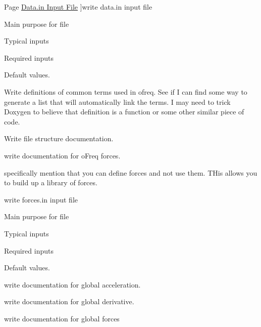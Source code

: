 \begin{DoxyRefList}
Page \hyperlink{in_data}{Data.in Input File} ]write data.\-in input file
\begin{DoxyItemize}
\item Main purpose for file
\item Typical inputs
\item Required inputs
\item Default values. 
\end{DoxyItemize}
\item[\label{todo__todo000039}%
\hypertarget{todo__todo000039}{}%
Page \hyperlink{definitions}{Definitions} ]Write definitions of common terms used in ofreq. See if I can find some way to generate a list that will automatically link the terms. I may need to trick Doxygen to believe that definition is a function or some other similar piece of code. 
\item[\label{todo__todo000037}%
\hypertarget{todo__todo000037}{}%
Page \hyperlink{file_structure}{File Structure} ]Write file structure documentation. 
\item[\label{todo__todo000002}%
\hypertarget{todo__todo000002}{}%
Page \hyperlink{concept_forces}{Forces in o\-Freq} ]write documentation for o\-Freq forces.
\begin{DoxyItemize}
\item specifically mention that you can define forces and not use them. T\-His allows you to build up a library of forces. 
\end{DoxyItemize}
\item[\label{todo__todo000009}%
\hypertarget{todo__todo000009}{}%
Page \hyperlink{in_forces}{Forces.in Input File} ]write forces.\-in input file
\begin{DoxyItemize}
\item Main purpose for file
\item Typical inputs
\item Required inputs
\item Default values. 
\end{DoxyItemize}
\item[\label{todo__todo000018}%
\hypertarget{todo__todo000018}{}%
Page \hyperlink{global_acceleration}{Global Acceleration} ]write documentation for global acceleration. 
\item[\label{todo__todo000019}%
\hypertarget{todo__todo000019}{}%
Page \hyperlink{global_derivative}{Global Derivative} ]write documentation for global derivative. 
\item[\label{todo__todo000020}%
\hypertarget{todo__todo000020}{}%
Page \hyperlink{global_force}{Global Forces} ]write documentation for global forces 

\end{DoxyRefList}
